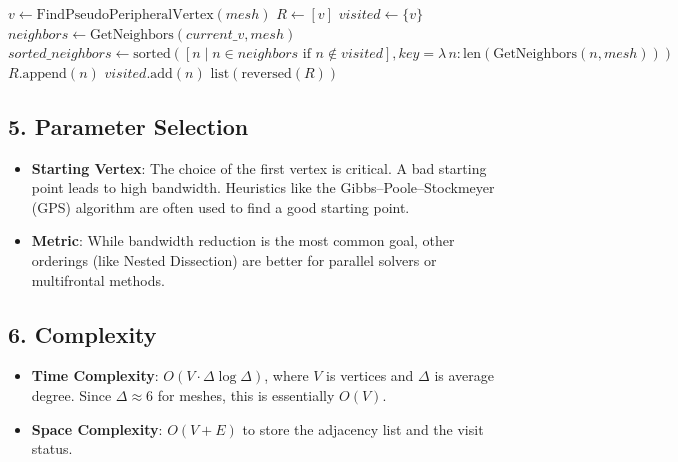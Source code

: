 \begin{algorithm}
\caption{RCM Reorder}
\label{alg:rcm_reorder}
\begin{algorithmic}[1]
    \State $v \gets \text{FindPseudoPeripheralVertex}(mesh)$
    \State $R \gets [v]$
    \State $\mathit{visited} \gets \{v\}$
        \State $\mathit{neighbors} \gets \text{GetNeighbors}(\mathit{current\_v}, mesh)$
        \State $\mathit{sorted\_neighbors} \gets \text{sorted}([n \mid n \in \mathit{neighbors} \text{ if } n \notin \mathit{visited}], \textit{key} = \lambda \, n : \text{len}(\text{GetNeighbors}(n, mesh)))$
            \State $R.\text{append}(n)$
            \State $\mathit{visited}.\text{add}(n)$
        \EndFor
    \EndFor
    \State \Return $\text{list}(\text{reversed}(R))$
\EndFunction
\end{algorithmic}
\end{algorithm}

\subsection{5. Parameter Selection}

\begin{itemize}
    \item \textbf{Starting Vertex}: The choice of the first vertex is critical. A bad starting point leads to high bandwidth. Heuristics like the Gibbs--Poole--Stockmeyer (GPS) algorithm are often used to find a good starting point.
    \item \textbf{Metric}: While bandwidth reduction is the most common goal, other orderings (like Nested Dissection) are better for parallel solvers or multifrontal methods.
\end{itemize}

\subsection{6. Complexity}

\begin{itemize}
    \item \textbf{Time Complexity}: $O(V \cdot \Delta \log \Delta)$, where $V$ is vertices and $\Delta$ is average degree. Since $\Delta \approx 6$ for meshes, this is essentially $O(V)$.
    \item \textbf{Space Complexity}: $O(V + E)$ to store the adjacency list and the visit status.
\end{itemize}

